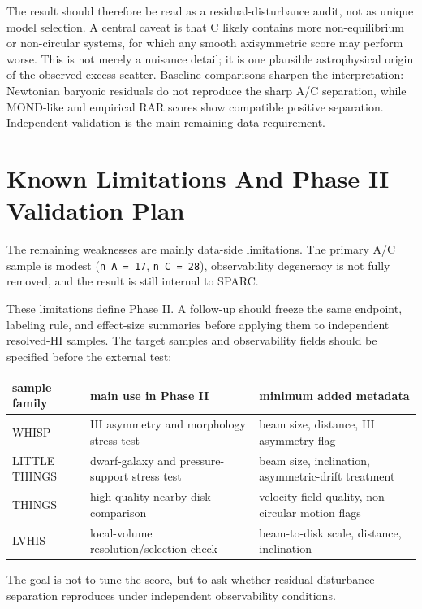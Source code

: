 \documentclass[11pt]{article}
\begin{document}
The result should therefore be read as a residual-disturbance audit, not as unique model selection. A central caveat is that C likely contains more non-equilibrium or non-circular systems, for which any smooth axisymmetric score may perform worse. This is not merely a nuisance detail; it is one plausible astrophysical origin of the observed excess scatter. Baseline comparisons sharpen the interpretation: Newtonian baryonic residuals do not reproduce the sharp A/C separation, while MOND-like and empirical RAR scores show compatible positive separation. Independent validation is the main remaining data requirement.

\section{Known Limitations And Phase II Validation Plan}
The remaining weaknesses are mainly data-side limitations. The primary A/C sample is modest (\texttt{n\_A = 17}, \texttt{n\_C = 28}), observability degeneracy is not fully removed, and the result is still internal to SPARC.

These limitations define Phase II. A follow-up should freeze the same endpoint, labeling rule, and effect-size summaries before applying them to independent resolved-HI samples. The target samples and observability fields should be specified before the external test:

\begin{table}[htbp]
\centering
\footnotesize
\setlength{\tabcolsep}{3pt}
\begin{tabularx}{\linewidth}{Y Y Y}
\toprule
sample family & main use in Phase II & minimum added metadata \\
\midrule
WHISP & HI asymmetry and morphology stress test & beam size, distance, HI asymmetry flag \\
LITTLE THINGS & dwarf-galaxy and pressure-support stress test & beam size, inclination, asymmetric-drift treatment \\
THINGS & high-quality nearby disk comparison & velocity-field quality, non-circular motion flags \\
LVHIS & local-volume resolution/selection check & beam-to-disk scale, distance, inclination \\
\bottomrule
\end{tabularx}
\end{table}
The goal is not to tune the score, but to ask whether residual-disturbance separation reproduces under independent observability conditions.
\end{document}
